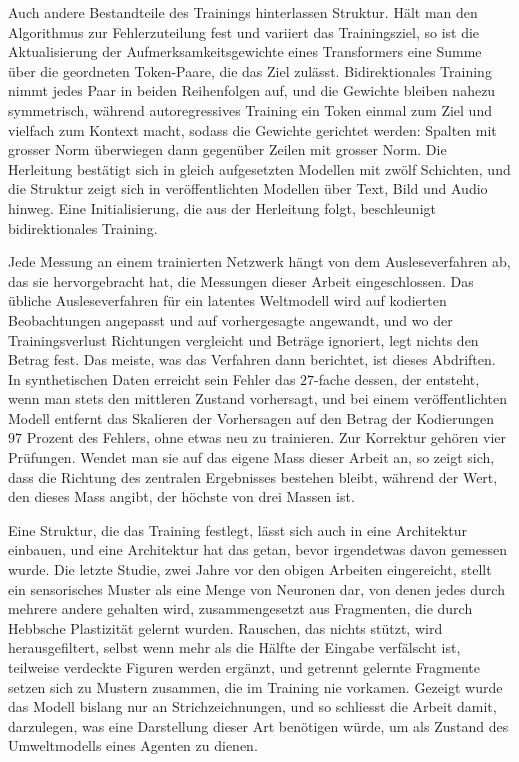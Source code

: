 Auch andere Bestandteile des Trainings hinterlassen Struktur. Hält man den
Algorithmus zur Fehlerzuteilung fest und variiert das
Trainingsziel, so ist die Aktualisierung der Aufmerksamkeitsgewichte eines
Transformers eine Summe über die geordneten Token-Paare, die das Ziel zulässt.
Bidirektionales Training nimmt jedes Paar in beiden Reihenfolgen auf, und die
Gewichte bleiben nahezu symmetrisch, während autoregressives Training ein Token
einmal zum Ziel und vielfach zum Kontext macht, sodass die Gewichte gerichtet
werden: Spalten mit grosser Norm überwiegen dann gegenüber Zeilen mit grosser
Norm. Die Herleitung bestätigt sich in gleich aufgesetzten Modellen mit
zwölf Schichten, und die Struktur zeigt sich in veröffentlichten Modellen über
Text, Bild und Audio hinweg. Eine Initialisierung, die aus der Herleitung
folgt, beschleunigt bidirektionales Training.

Jede Messung an einem trainierten Netzwerk hängt von dem Ausleseverfahren ab,
das sie hervorgebracht hat, die Messungen dieser Arbeit eingeschlossen. Das übliche
Ausleseverfahren für ein latentes Weltmodell wird auf kodierten Beobachtungen
angepasst und auf vorhergesagte angewandt, und wo der Trainingsverlust
Richtungen vergleicht und Beträge ignoriert, legt nichts den Betrag fest. Das
meiste, was das Verfahren dann berichtet, ist dieses Abdriften. In
synthetischen Daten
erreicht sein Fehler das $27$-fache dessen, der entsteht, wenn man stets den
mittleren Zustand vorhersagt, und bei einem veröffentlichten Modell entfernt
das Skalieren der Vorhersagen auf den Betrag der Kodierungen $97$ Prozent des
Fehlers, ohne etwas neu zu trainieren. Zur Korrektur gehören vier Prüfungen.
Wendet man sie auf das eigene Mass dieser Arbeit an, so zeigt sich, dass die
Richtung des zentralen Ergebnisses bestehen bleibt, während der Wert, den
dieses Mass angibt, der höchste von drei Massen ist.

Eine Struktur, die das Training festlegt, lässt sich auch in eine Architektur
einbauen, und eine Architektur hat das getan, bevor irgendetwas davon gemessen
wurde. Die
letzte Studie, zwei Jahre vor den obigen Arbeiten eingereicht, stellt ein
sensorisches Muster als eine Menge von Neuronen dar, von denen jedes durch mehrere andere gehalten wird,
zusammengesetzt aus Fragmenten, die durch Hebbsche Plastizität gelernt wurden.
Rauschen, das nichts stützt, wird herausgefiltert, selbst wenn mehr als die
Hälfte der Eingabe verfälscht ist, teilweise verdeckte Figuren werden ergänzt,
und getrennt gelernte Fragmente setzen sich zu Mustern zusammen, die im
Training nie vorkamen. Gezeigt wurde das Modell bislang nur an
Strichzeichnungen, und so schliesst die Arbeit damit, darzulegen, was eine
Darstellung dieser Art benötigen würde, um als Zustand des Umweltmodells eines
Agenten zu dienen.
